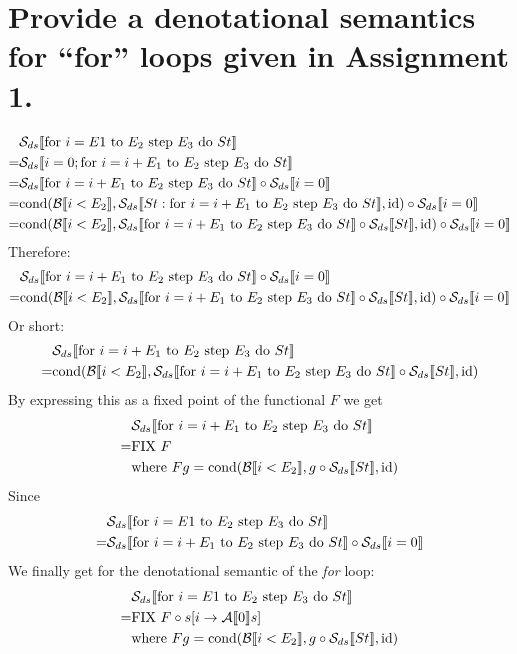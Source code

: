 \section{Provide a denotational semantics for ``for'' loops given in Assignment 1.}
\begin{align}
    & \dsstmt{\forloop{i=E1}{E_2}{E_3}{St}}  \\
=   & \dsstmt{i=0; \forloop{i=i+E_1}{E_2}{E_3}{St}}   \\
=   & \dsstmt{\forloop{i=i+E_1}{E_2}{E_3}{St}} \circ \dsstmt{i=0} \\
=		& \dscond{\dsbool{i < E_2}}
						 {\dsstmt{St: \forloop{i=i+E_1}{E_2}{E_3}{St}}}
						 {\text{id}} 
		  \circ \dsstmt{i=0} \\
=		& \dscond{\dsbool{i < E_2}}
						 {\dsstmt{\forloop{i=i+E_1}{E_2}{E_3}{St}} \circ \dsstmt{St}}
						 {\text{id}} 
			\circ \dsstmt{i=0}
\end{align}
Therefore:
\begin{align}
	  & \dsstmt{\forloop{i=i+E_1}{E_2}{E_3}{St}} \circ \dsstmt{i=0} \\
=		& \dscond{\dsbool{i < E_2}}
						 {\dsstmt{\forloop{i=i+E_1}{E_2}{E_3}{St}} \circ \dsstmt{St}}
						 {\text{id}} 
			\circ \dsstmt{i=0}
\end{align}
Or short:
\begin{align}
	  & \dsstmt{\forloop{i=i+E_1}{E_2}{E_3}{St}} \\
=		& \dscond{\dsbool{i < E_2}}
						 {\dsstmt{\forloop{i=i+E_1}{E_2}{E_3}{St}} \circ \dsstmt{St}}
						 {\text{id}} 
\end{align}
By expressing this as a fixed point of the functional $F$ we get
\begin{align}
	  & \dsstmt{\forloop{i=i+E_1}{E_2}{E_3}{St}} \\
=   & \dsfix{F} \\
		& \text{where } F g = \dscond{\dsbool{i < E_2}}
																 {g \circ \dsstmt{St}}
																 {\text{id}} 
\end{align}
Since
\begin{align}
    & \dsstmt{\forloop{i=E1}{E_2}{E_3}{St}}   \\
=   & \dsstmt{\forloop{i=i+E_1}{E_2}{E_3}{St}} \circ \dsstmt{i=0}
\end{align}
We finally get for the denotational semantic of the \emph{for} loop:
\begin{align}
    & \dsstmt{\forloop{i=E1}{E_2}{E_3}{St}}   \\
=   & \dsfix{F} \circ s[i \to \dsasgn{0}s] \\
		& \text{where } F g = \dscond{\dsbool{i < E_2}}
																 {g \circ \dsstmt{St}}
																 {\text{id}} 
\end{align}